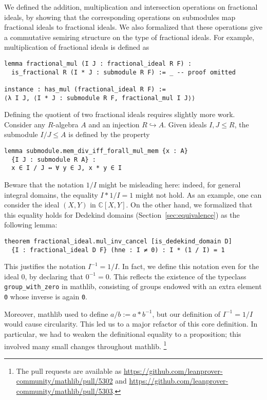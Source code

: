 \documentclass[sn-mathphys]{sn-jnl}%
\renewcommand{\C}{\mathbb{C}}
\newcommand{\lean}[1]{\texttt{#1}\xspace}
\newcommand{\mathlib}{\textsf{mathlib}\xspace}
\begin{document}
We defined the addition, multiplication and intersection operations on fractional ideals,
by showing that the corresponding operations on submodules map fractional ideals to fractional ideals.
We also formalized that these operations give a commutative semiring structure on the type of fractional ideals.
For example, multiplication of fractional ideals is defined as
\begin{lstlisting}
lemma fractional_mul (I J : fractional_ideal R F) :
  is_fractional R (I * J : submodule R F) := _ -- proof omitted

instance : has_mul (fractional_ideal R F) :=
⟨λ I J, ⟨I * J : submodule R F, fractional_mul I J⟩⟩
\end{lstlisting}

Defining the quotient of two fractional ideals requires slightly more work. Consider any $R$-algebra $A$ and an injection $R\hookrightarrow A$. Given ideals $I,J\le R$, the submodule $I / J\le A$
is defined by the property
\pagebreak[3] %
\begin{lstlisting}
lemma submodule.mem_div_iff_forall_mul_mem {x : A}
  {I J : submodule R A} :
  x ∈ I / J ↔ ∀ y ∈ J, x * y ∈ I
\end{lstlisting}
Beware that the notation $1/I$ might be misleading here: indeed, for general integral domains, the equality $I\ast 1/I=1$ might not hold. As an example, one can consider the ideal $(X,Y)$ in $\C[X,Y]$.
On the other hand, we formalized that this equality holds for Dedekind domains (Section~\ref{sec:equivalence}) as the following lemma:
\begin{lstlisting}
theorem fractional_ideal.mul_inv_cancel [is_dedekind_domain D]
  {I : fractional_ideal D F} (hne : I ≠ 0) : I * (1 / I) = 1
\end{lstlisting}
This justifies the notation $I^{-1}=1/I$. In fact, we define this notation even for the ideal $0$, by declaring that $0^{-1}=0$. This reflects the existence of the typeclass \lean{group\_with\_zero} in \mathlib, consisting of groups endowed with an extra element \lean{0} whose inverse is again \lean{0}.

Moreover, \mathlib used to define \lean{$a / b := a * b^{-1}$}, but our definition of $I^{-1} = 1 / I$ would cause circularity. This led us to a major refactor of this core definition. In particular, we had to weaken the definitional equality to a proposition; this involved many small changes throughout \mathlib.%
\footnote{The pull requests are available as \url{https://github.com/leanprover-community/mathlib/pull/5302} and \url{https://github.com/leanprover-community/mathlib/pull/5303}.}
\end{document}
